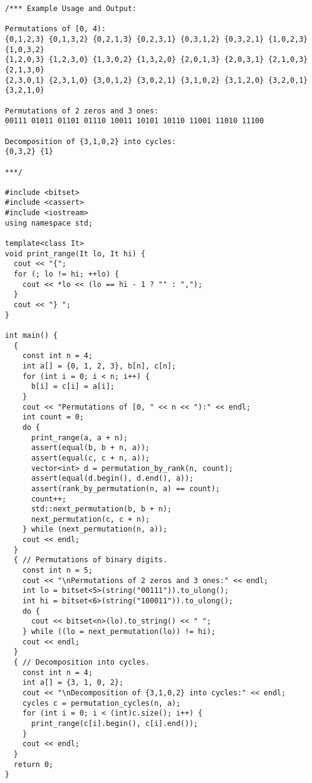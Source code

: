 \begin{lstlisting}
/*** Example Usage and Output:

Permutations of [0, 4):
{0,1,2,3} {0,1,3,2} {0,2,1,3} {0,2,3,1} {0,3,1,2} {0,3,2,1} {1,0,2,3} {1,0,3,2}
{1,2,0,3} {1,2,3,0} {1,3,0,2} {1,3,2,0} {2,0,1,3} {2,0,3,1} {2,1,0,3} {2,1,3,0}
{2,3,0,1} {2,3,1,0} {3,0,1,2} {3,0,2,1} {3,1,0,2} {3,1,2,0} {3,2,0,1} {3,2,1,0}

Permutations of 2 zeros and 3 ones:
00111 01011 01101 01110 10011 10101 10110 11001 11010 11100

Decomposition of {3,1,0,2} into cycles:
{0,3,2} {1}

***/

#include <bitset>
#include <cassert>
#include <iostream>
using namespace std;

template<class It>
void print_range(It lo, It hi) {
  cout << "{";
  for (; lo != hi; ++lo) {
    cout << *lo << (lo == hi - 1 ? "" : ",");
  }
  cout << "} ";
}

int main() {
  {
    const int n = 4;
    int a[] = {0, 1, 2, 3}, b[n], c[n];
    for (int i = 0; i < n; i++) {
      b[i] = c[i] = a[i];
    }
    cout << "Permutations of [0, " << n << "):" << endl;
    int count = 0;
    do {
      print_range(a, a + n);
      assert(equal(b, b + n, a));
      assert(equal(c, c + n, a));
      vector<int> d = permutation_by_rank(n, count);
      assert(equal(d.begin(), d.end(), a));
      assert(rank_by_permutation(n, a) == count);
      count++;
      std::next_permutation(b, b + n);
      next_permutation(c, c + n);
    } while (next_permutation(n, a));
    cout << endl;
  }
  { // Permutations of binary digits.
    const int n = 5;
    cout << "\nPermutations of 2 zeros and 3 ones:" << endl;
    int lo = bitset<5>(string("00111")).to_ulong();
    int hi = bitset<6>(string("100011")).to_ulong();
    do {
      cout << bitset<n>(lo).to_string() << " ";
    } while ((lo = next_permutation(lo)) != hi);
    cout << endl;
  }
  { // Decomposition into cycles.
    const int n = 4;
    int a[] = {3, 1, 0, 2};
    cout << "\nDecomposition of {3,1,0,2} into cycles:" << endl;
    cycles c = permutation_cycles(n, a);
    for (int i = 0; i < (int)c.size(); i++) {
      print_range(c[i].begin(), c[i].end());
    }
    cout << endl;
  }
  return 0;
}
\end{lstlisting}
